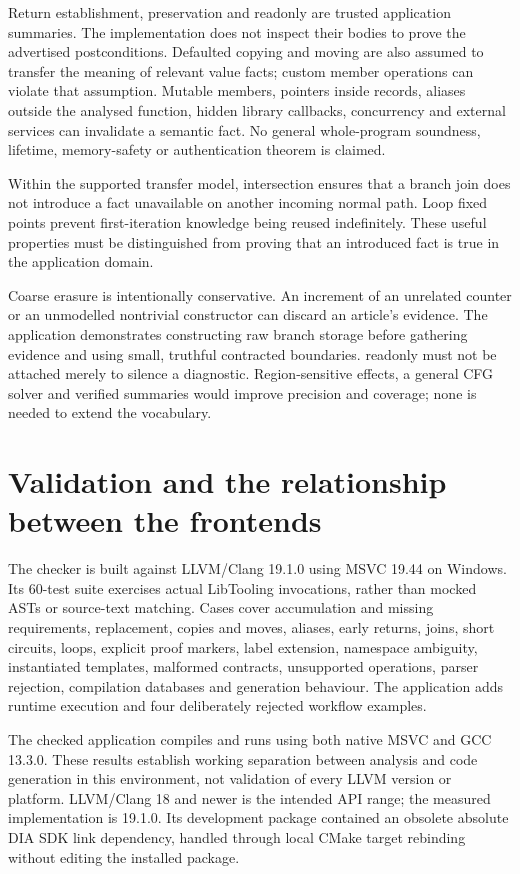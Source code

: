 \documentclass[11pt]{article}
\begin{document}
Return establishment, preservation and readonly are trusted application
summaries. The implementation does not inspect their bodies to prove the
advertised postconditions. Defaulted copying and moving are also assumed to
transfer the meaning of relevant value facts; custom member operations can
violate that assumption. Mutable members, pointers inside records, aliases
outside the analysed function, hidden library callbacks, concurrency and
external services can invalidate a semantic fact. No general whole-program
soundness, lifetime, memory-safety or authentication theorem is claimed.

Within the supported transfer model, intersection ensures that a branch join
does not introduce a fact unavailable on another incoming normal path. Loop
fixed points prevent first-iteration knowledge being reused indefinitely.
These useful properties must be distinguished from proving that an introduced
fact is true in the application domain.

Coarse erasure is intentionally conservative. An increment of an unrelated
counter or an unmodelled nontrivial constructor can discard an article's
evidence. The application demonstrates constructing raw branch storage before
gathering evidence and using small, truthful contracted boundaries. readonly
must not be attached merely to silence a diagnostic. Region-sensitive effects,
a general CFG solver and verified summaries would improve precision and
coverage; none is needed to extend the vocabulary.

\section{Validation and the relationship between the frontends}
The checker is built against LLVM/Clang 19.1.0 using MSVC 19.44 on Windows.
Its 60-test suite exercises actual LibTooling invocations, rather than mocked
ASTs or source-text matching. Cases cover accumulation and missing requirements,
replacement, copies and moves, aliases, early returns, joins, short circuits,
loops, explicit proof markers, label extension, namespace ambiguity, instantiated
templates, malformed contracts, unsupported operations, parser rejection,
compilation databases and generation behaviour. The application adds runtime
execution and four deliberately rejected workflow examples.

The checked application compiles and runs using both native MSVC and GCC
13.3.0. These results establish working separation between analysis and code
generation in this environment, not validation of every LLVM version or
platform. LLVM/Clang 18 and newer is the intended API range; the measured
implementation is 19.1.0. Its development package contained an obsolete absolute
DIA SDK link dependency, handled through local CMake target rebinding without
editing the installed package.
\end{document}
